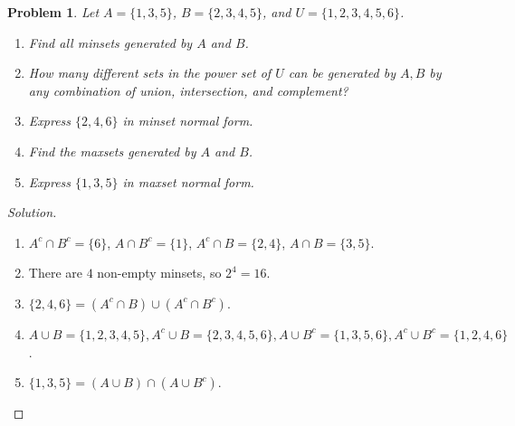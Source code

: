 \documentclass[oneside]{book}
\theoremstyle{mystyle}
\newtheorem{problem}{Problem}[section]
\begin{document}
\begin{problem}
Let $A = \{1,3,5\}$, $B = \{2,3,4,5\}$, and $U = \{1,2,3,4,5,6\}$.
\begin{enumerate}
    \item Find all minsets generated by $A$ and $B$.
    \item How many different sets in the power set of $U$ can be generated by $A,B$ by any combination of union, intersection, and complement?
    \item Express $\{2,4,6\}$ in minset normal form.
    \item Find the maxsets generated by $A$ and $B$.
    \item Express $\{1,3,5\}$ in maxset normal form.
\end{enumerate}
\end{problem}
\begin{proof}[Solution]
\
\begin{enumerate}
    \item $A^c\cap B^c = \{6\}$, $A\cap B^c = \{1\}$, $A^c \cap B = \{2,4\}$, $A\cap B = \{3,5\}$.
    \item There are $4$ non-empty minsets, so $2^4 = 16$. 
    \item $\{2,4,6\} = (A^c \cap B)\cup (A^c \cap B^c)$.
    \item $A\cup B = \{1,2,3,4,5\}, A^c \cup B = \{2,3,4,5,6\}, A\cup B^c = \{1,3,5,6\}, A^c \cup B^c = \{1,2,4,6\}$.
    \item $\{1,3,5\} = (A\cup B) \cap (A\cup B^c)$.
\end{enumerate}
\end{proof}
\end{document}
